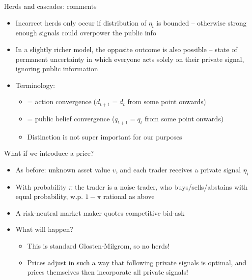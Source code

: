 \documentclass[english,10pt
,aspectratio=169
]{beamer}
\begin{document}
\begin{frame}{Herds and cascades: comments}
	\begin{itemize}
		\item Incorrect herds only occur if distribution of $\eta_i$ is bounded -- otherwise strong enough signals could overpower the public info
		\item In a slightly richer model, the opposite outcome is also possible -- state of permanent uncertainty in which everyone acts solely on their private signal, ignoring public information
		\item Terminology:
		\begin{itemize}
			\item {} = action convergence ($d_{t+1} = d_t$ from some point onwards)
			\item {} = public belief convergence ($q_{t+1} = q_t$ from some point onwards)
			\item Distinction is not super important for our purposes
		\end{itemize}
	\end{itemize}
\end{frame}


\begin{frame}{What if we introduce a price?}
	\begin{itemize}
		\item As before: unknown asset value $v$, and each trader receives a private signal $\eta_i$
		\item With probability $\pi$ the trader is a noise trader, who buys/sells/abstains with equal probability, w.p. $1-\pi$ rational as above
		\item A risk-neutral market maker quotes competitive bid-ask \structure<1>{prices}
		\item What will happen?
		\begin{itemize}
			\pause
			\item This is standard Glosten-Milgrom, so no herds!
			\item Prices adjust in such a way that following private signals is optimal, and prices themselves then incorporate all private signals!
		\end{itemize}
	\end{itemize}
\end{frame}
\end{document}
